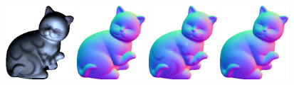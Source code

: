     \\
    \includegraphics[width=0.190\textwidth]{ch-psfcn/images/Results/DiLiGenT/GT/4.0_catPNG_001.png}
    \includegraphics[width=0.190\textwidth]{ch-psfcn/images/Results/DiLiGenT/GT/catPNGGT_normal.png}
    \includegraphics[width=0.190\textwidth]{ch-psfcn/images/Results/DiLiGenT/PS-FCN/catPNGDiLiGenT_normal.png}
    \includegraphics[width=0.190\textwidth]{ch-psfcn/images/Results/DiLiGenT/SVBRDF/PS-FCN_normalized/catPNGDiLiGenT_normal.png}
    \\
    \vspace{-1.2em}
    \makebox[0.190\textwidth]{} 
    \makebox[0.190\textwidth]{} 
